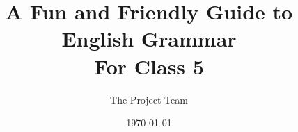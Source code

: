 
\title{A Fun and Friendly Guide to English Grammar \\ \large For Class 5}
\author{The Project Team}
\date{\today}